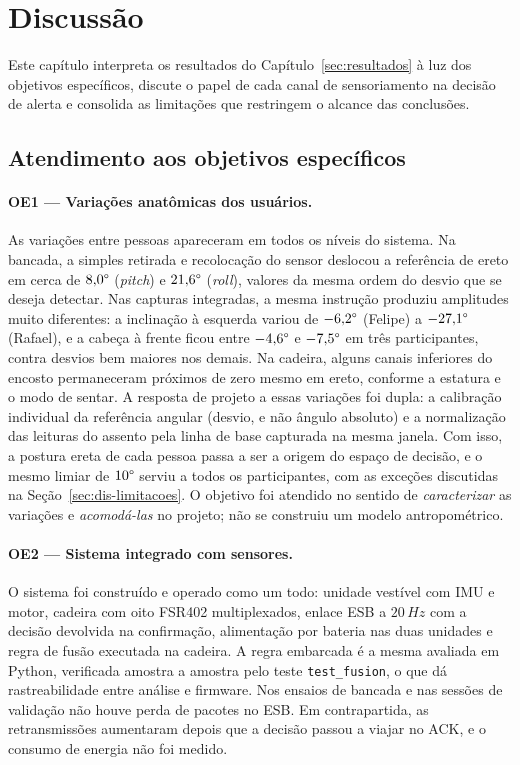 \section{Discussão}
\label{sec:discussao}

Este capítulo interpreta os resultados do Capítulo~\ref{sec:resultados} à luz
dos objetivos específicos, discute o papel de cada canal de sensoriamento na
decisão de alerta e consolida as limitações que restringem o alcance das
conclusões.

\subsection{Atendimento aos objetivos específicos}
\label{sec:dis-objetivos}

\paragraph{OE1 --- Variações anatômicas dos usuários.}
As variações entre pessoas apareceram em todos os níveis do sistema. Na
bancada, a simples retirada e recolocação do sensor deslocou a referência de
ereto em cerca de $8{,}0\degree{}$ (\textit{pitch}) e $21{,}6\degree{}$
(\textit{roll}), valores da mesma ordem do desvio que se deseja detectar. Nas
capturas integradas, a mesma instrução produziu amplitudes muito diferentes:
a inclinação à esquerda variou de $-6{,}2\degree{}$ (Felipe) a
$-27{,}1\degree{}$ (Rafael), e a cabeça à frente ficou entre $-4{,}6\degree{}$
e $-7{,}5\degree{}$ em três participantes, contra desvios bem maiores nos
demais. Na cadeira, alguns canais inferiores do encosto permaneceram próximos
de zero mesmo em ereto, conforme a estatura e o modo de sentar. A resposta de
projeto a essas variações foi dupla: a calibração individual da referência
angular (desvio, e não ângulo absoluto) e a normalização das leituras do
assento pela linha de base capturada na mesma janela. Com isso, a postura
ereta de cada pessoa passa a ser a origem do espaço de decisão, e o mesmo
limiar de $10\degree{}$ serviu a todos os participantes, com as exceções
discutidas na Seção~\ref{sec:dis-limitacoes}. O objetivo foi atendido no
sentido de \emph{caracterizar} as variações e \emph{acomodá-las} no projeto;
não se construiu um modelo antropométrico.

\paragraph{OE2 --- Sistema integrado com sensores.}
O sistema foi construído e operado como um todo: unidade vestível com IMU e
motor, cadeira com oito FSR402 multiplexados, enlace ESB a $20\,Hz$ com a
decisão devolvida na confirmação, alimentação por bateria nas duas unidades e
regra de fusão executada na cadeira. A regra embarcada é a mesma avaliada em
Python, verificada amostra a amostra pelo teste \texttt{test\_fusion}, o que
dá rastreabilidade entre análise e firmware. Nos ensaios de bancada e nas
sessões de validação não houve perda de pacotes no ESB. Em contrapartida, as
retransmissões aumentaram depois que a decisão passou a viajar no ACK, e o
consumo de energia não foi medido.

